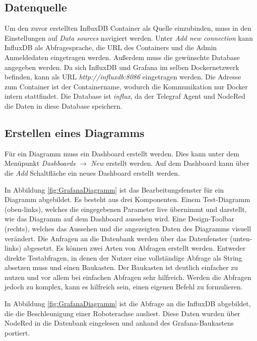 \documentclass[a4paper, 12pt, oneside, toc=listofnumbered, bibliography=totoc]{scrbook}
\begin{document}
		\subsection{Datenquelle}
		
		Um den zuvor erstellten InfluxDB Container als Quelle einzubinden, muss in den Einstellungen auf \textit{Data sources} navigiert werden. Unter \textit{Add new connection} kann InfluxDB als Abfragesprache, die URL des Containers und die Admin Anmeldedaten eingetragen werden. Außerdem muss die gewünschte Database angegeben werden. Da sich InfluxDB und Grafana im selben Dockernetzwerk befinden, kann als URL \textit{http://influxdb:8086} eingetragen werden. Die Adresse zum Container ist der Containername, wodurch die Kommunikation nur Docker intern stattfindet. Die Database ist \textit{influx}, da der Telegraf Agent und NodeRed die Daten in diese Database speichern.
		
		
		\subsection{Erstellen eines Diagramms}
		
		Für ein Diagramm muss ein Dashboard erstellt werden. Dies kann unter dem Menüpunkt \textit{Dashboards} $\rightarrow$ \textit{New} erstellt werden. Auf dem Dashboard kann über die \textit{Add} Schaltfläche ein neues Dashboard erstellt werden.
		
		In Abbildung \ref{fig:GrafanaDiagramm} ist das Bearbeitungsfenster für ein Diagramm abgebildet. Es besteht aus drei Komponenten. Einem Test-Diagramm (oben-links), welches die eingegebenen Parameter live übernimmt und darstellt, wie das Diagramm auf dem Dashboard aussehen wird. Eine Design-Toolbar (rechts), welches das Aussehen und die angezeigten Daten des Diagramms visuell verändert. Die Anfragen an die Datenbank werden über das Datenfenster (unten-links) abgesetzt. Es können zwei Arten von Abfragen erstellt werden. Entweder direkte Testabfragen, in denen der Nutzer eine vollständige Abfrage als String absetzen muss und einen Baukasten. Der Baukasten ist deutlich einfacher zu nutzen und vor allem bei einfachen Abfragen sehr hilfreich. Werden die Abfragen jedoch zu komplex, kann es hilfreich sein, einen eigenen Befehl zu formulieren.
		
		In Abbildung \ref{fig:GrafanaDiagramm} ist die Abfrage an die InfluxDB abgebildet, die die Beschleunigung einer Roboterachse ausliest. Diese Daten wurden über NodeRed in die Datenbank eingelesen und anhand des Grafana-Baukastens portiert. 
		
\end{document}
